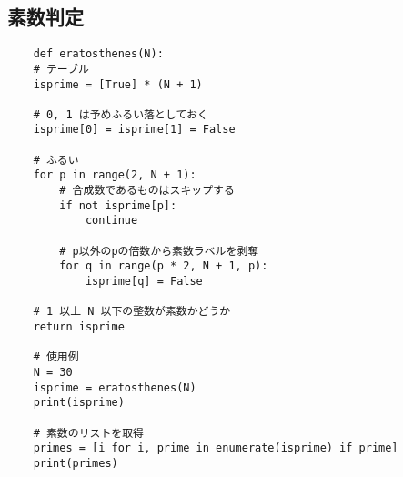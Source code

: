 \documentclass[a4paper, landscape, 9pt]{jarticle} %
\begin{document}
\begin{multicols*}{3}
    \subsection{素数判定}
    \begin{lstlisting}
    def eratosthenes(N):
    # テーブル
    isprime = [True] * (N + 1)
    
    # 0, 1 は予めふるい落としておく
    isprime[0] = isprime[1] = False
    
    # ふるい
    for p in range(2, N + 1):
        # 合成数であるものはスキップする
        if not isprime[p]:
            continue
        
        # p以外のpの倍数から素数ラベルを剥奪
        for q in range(p * 2, N + 1, p):
            isprime[q] = False
    
    # 1 以上 N 以下の整数が素数かどうか
    return isprime
    
    # 使用例
    N = 30
    isprime = eratosthenes(N)
    print(isprime)
    
    # 素数のリストを取得
    primes = [i for i, prime in enumerate(isprime) if prime]
    print(primes)
    \end{lstlisting}


\end{multicols*}
\end{document}
